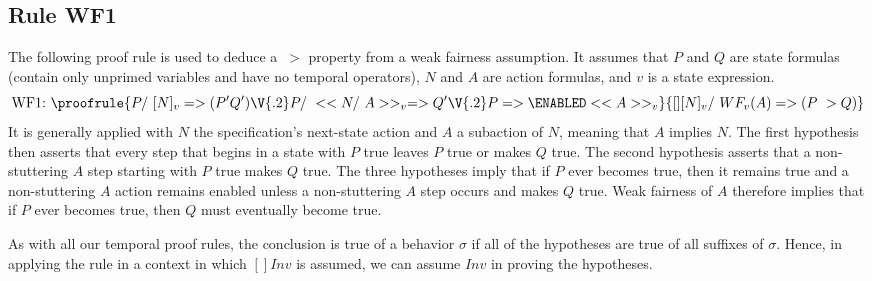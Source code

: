\documentclass[fleqn,leqno]{article}
\begin{document}
\subsection*{Rule WF1}

The 
following proof rule is used to deduce a $~>$ property from a weak
fairness assumption.  It assumes that $P$ and $Q$ are state formulas
(contain only unprimed variables and have no temporal operators),
$N$ and $A$ are action formulas, and $v$ is a state expression.
 \[ \mbox{WF1:}\ \proofrule{P /\ [N]_v => (P' \/ Q') \V{.2}
              P /\ <<N /\ A>>_v => Q' \V{.2}
              P => \ENABLED <<A>>_v}%
              {[][N]_v /\ WF_v(A) => (P ~> Q)}
 \]
It is generally applied with $N$ the specification's next-state action
and $A$ a subaction of $N$, meaning that $A$ implies $N$.  The first
hypothesis then asserts that every step that begins in a state with
$P$ true leaves $P$ true or makes $Q$ true.  The second hypothesis
asserts that a non-stuttering $A$ step starting with $P$ true makes
$Q$ true.  The three hypotheses imply that if $P$ ever becomes true,
then it remains true and a non-stuttering $A$ action remains enabled
unless a non-stuttering $A$ step occurs and makes $Q$ true.  Weak
fairness of $A$ therefore implies that if $P$ ever becomes true, then
$Q$ must eventually become true.

\medskip

As with all our temporal proof rules, the conclusion is true of a
behavior $\sigma$ if all of the hypotheses are true of all suffixes of
$\sigma$.  Hence, in applying the rule in a context in which $[]Inv$
is assumed, we can assume $Inv$ in proving the hypotheses.
\end{document}
